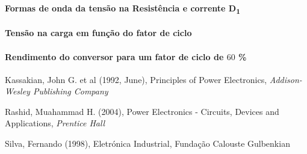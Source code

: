 \documentclass[a4paper,11pt]{article}
\numberwithin{equation}{section}
\begin{document}
\paragraph{Formas de onda da tensão na Resistência e corrente D\textsubscript{1}}

\paragraph{Tensão na carga em função do fator de ciclo}

\paragraph{Rendimento do conversor para um fator de ciclo de $60$ \%}

\pagebreak

\begin{thebibliography}{2}
	
	Kassakian, John G. et al (1992, June), Principles of Power Electronics, \textit{Addison-Wesley Publishing Company}

	Rashid, Muahammad H. (2004), Power Electronics - Circuits, Devices and Applications, \textit{Prentice Hall}
	
	Silva, Fernando (1998), Eletrónica Industrial, Fundação Calouste Gulbenkian
	
\end{thebibliography}


\pagebreak
\end{document}
